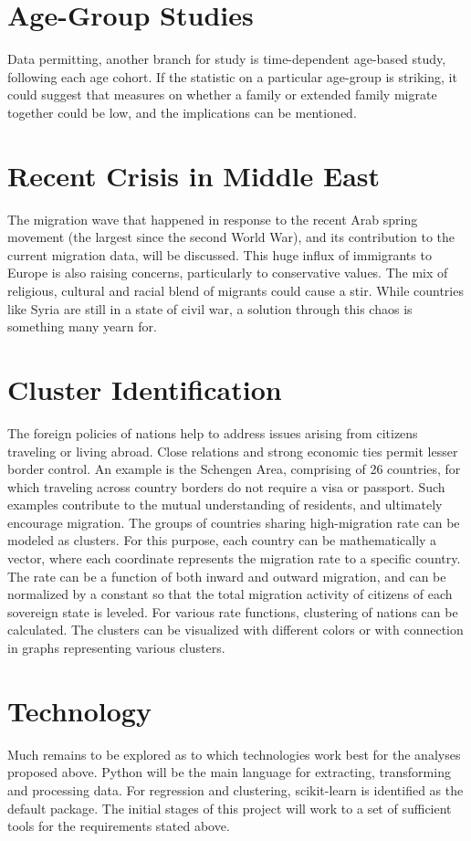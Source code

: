 \documentclass{acm_proc_article-sp}
\begin{document}
\section{Age-Group Studies}
Data permitting, another branch for study is time-dependent age-based study, following each age cohort.\cite{UNDownload000} If the statistic on a particular age-group is striking, it could suggest that measures on whether a family or extended family migrate together could be low, and the implications can be mentioned. 

\section{Recent Crisis in Middle East}
The migration wave that happened in response to the recent Arab spring movement (the largest since the second World War), and its contribution to the current migration data, will be discussed. This huge influx of immigrants to Europe is also raising concerns, particularly to conservative values. The mix of religious, cultural and racial blend of migrants could cause a stir. While countries like Syria are still in a state of civil war, a solution through this chaos is something many yearn for.\cite{MPI,Eurostat}

\section{Cluster Identification}
The foreign policies of nations help to address issues arising from citizens traveling or living abroad. Close relations and strong economic ties permit lesser border control. An example is the Schengen Area, comprising of 26 countries, for which traveling across country borders do not require a visa or passport. Such examples contribute to the mutual understanding of residents, and ultimately encourage migration. The groups of countries sharing high-migration rate can be modeled as clusters. For this purpose, each country can be mathematically a vector, where each coordinate represents the migration rate to a specific country. The rate can be a function of both inward and outward migration, and can be normalized by a constant so that the total migration activity of citizens of each sovereign state is leveled. For various rate functions, clustering of nations can be calculated. The clusters can be visualized with different colors or with connection in graphs representing various clusters.

\section{Technology}
Much remains to be explored as to which technologies work best for the analyses proposed above. Python will be the main language for extracting, transforming and processing data. For regression and clustering, scikit-learn is identified as the default package. The initial stages of this project will work to a set of sufficient tools for the requirements stated above.
\end{document}
